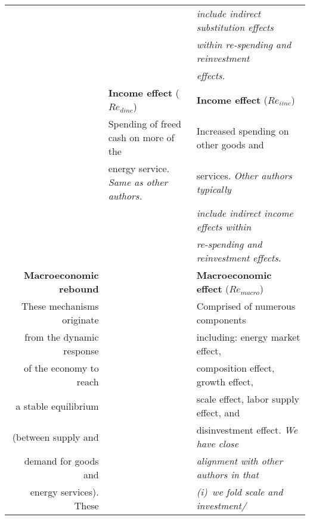 \begin{table}
\begin{center}
\begin{tabular}{ r l l }
                                   &                                             & \emph{include indirect substitution effects} \\
                                   &                                             & \emph{within re-spending and reinvestment} \\ 
                                   &                                             & \emph{effects.} \\ 
                                   \cmidrule{2-3}
                                   & \textbf{Income effect} ($Re_{dinc}$)        & \textbf{Income effect} ($Re_{iinc}$) \\
                                   & Spending of freed cash on more of the       & Increased spending on other goods and \\
                                   & energy service. \emph{Same as other authors.} & services. \emph{Other authors typically} \\
                                   &                                             & \emph{include indirect income effects within} \\ 
                                   &                                             & \emph{re-spending and reinvestment effects.} \\
                                   \cmidrule{2-3}
\textbf{Macroeconomic rebound}     &                                             & \textbf{Macroeconomic effect} ($Re_{macro}$) \\
These mechanisms originate         &                                             & Comprised of numerous components \\
from the dynamic response          &                                             & including: energy market effect, \\
of the economy to reach            &                                             & composition effect, growth effect, \\
a stable equilibrium               &                                             & scale effect, labor supply effect, and \\
(between supply and                &                                             & disinvestment effect. \emph{We have close} \\
demand for goods and               &                                             & \emph{alignment with other authors in that} \\
energy services). These            &                                             & \emph{(i)~we fold scale and investment/} \\

\end{tabular}
\end{center}
\end{table}
